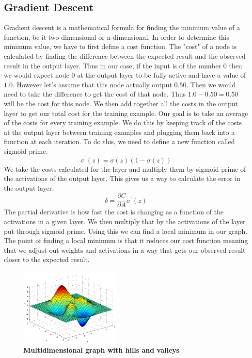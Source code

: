 \documentclass[12pt]{article}
\theoremstyle{definition}
\theoremstyle{plain}
\begin{document}
\subsection{Gradient Descent}
Gradient descent is a mathematical formula for finding the minimum value of a function, be it two dimensional or n-dimensional. In order to determine this minimum value, we have to first define a cost function. The "cost" of a node is calculated by finding the difference between the expected result and the observed result in the output layer. Thus in our case, if the input is of the number 0 then we would expect node 0 at the output layer to be fully active and have a value of $1.0$. However let's assume that this node actually output $0.50$. Then we would need to take the difference to get the cost of that node. Thus $1.0-0.50 = 0.50$ will be the cost for this node. We then add together all the costs in the output layer to get our total cost for the training example. Our goal is to take an average of the costs for every training example. We do this by keeping track of the costs at the output layer between training examples and plugging them back into a function at each iteration. To do this, we need to define a new function called sigmoid prime\cite{welch_2015}.
\begin{equation}\label{eqn:SigmoidPrime}
\sigma^\prime(z) = \sigma(z)(1-\sigma(z))
\end{equation}
We take the costs calculated for the layer and multiply them by sigmoid prime of the activations of the output layer. This gives us a way to calculate the error in the output layer.
\begin{equation}\label{eqn:Delta}
\delta = \dfrac{\partial C}{\partial A}\sigma^\prime(z)
\end{equation}
The partial derivative is how fast the cost is changing as a function of the activations in a given layer. We then multiply that by the activations of the layer put through sigmoid prime.  Using this we can find a local minimum in our graph. The point of finding a local minimum is that it reduces our cost function meaning that we adjust out weights and activations in a way that gets our observed result closer to the expected result. 
\begin{figure}
	\centering
	\includegraphics[width=0.45\textwidth]{Images/Gradient.png}
	\caption{\textbf{Multidimensional graph with hills and valleys} \cite{steemit}}
	\label{fig:Gradient}
\end{figure}
\end{document}
